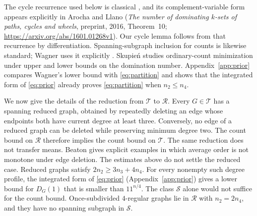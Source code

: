 \documentclass[11pt]{article}
\begin{document}
The cycle recurrence used below is classical \cite[Theorem 4.5]{AP2010}, and its complement-variable form appears explicitly in Arocha and Llano (\emph{The number of dominating $k$-sets of paths, cycles and wheels}, preprint, 2016, Theorem~10; \url{https://arxiv.org/abs/1601.01268v1}). Our cycle lemma follows from that recurrence by differentiation. Spanning-subgraph inclusion for counts is likewise standard; Wagner uses it explicitly \cite{Wagner2013}. Skupie\'n \cite{Skupien2014} studies ordinary-count minimization under upper and lower bounds on the domination number. Appendix~\ref{app:prior} compares Wagner's lower bound with \eqref{eq:partition} and shows that the integrated form of \eqref{eq:prior} already proves \eqref{eq:partition} when $n_2\le n_4$.

We now give the details of the reduction from $\mathcal T$ to $\mathcal R$. Every $G\in\mathcal T$ has a spanning reduced graph, obtained by repeatedly deleting an edge whose endpoints both have current degree at least three. Conversely, no edge of a reduced graph can be deleted while preserving minimum degree two. The count bound on $\mathcal R$ therefore implies the count bound on $\mathcal T$. The same reduction does not transfer means. Beaton \cite[Section 6.2]{Beaton2021} gives explicit examples in which average order is not monotone under edge deletion. The estimates above do not settle the reduced case. Reduced graphs satisfy $2n_2\ge3n_3+4n_4$. For every nonempty such degree profile, the integrated form of \eqref{eq:prior} (Appendix~\ref{app:prior}) gives a lower bound for $D_G(1)$ that is smaller than $11^{n/4}$. The class $\mathcal S$ alone would not suffice for the count bound. Once-subdivided $4$-regular graphs lie in $\mathcal R$ with $n_2=2n_4$, and they have no spanning subgraph in $\mathcal S$.
\end{document}
